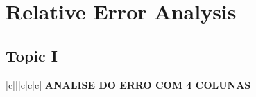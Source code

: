 \section{Relative Error Analysis}
\label{sec:erroranalysis}

\subsection{Topic I}
\label{subsec:first_topic_error}

\begin{center}
   \begin{tabular}{|c|||c|c|c|}
      \hline    
       {\bf ANALISE DO ERRO COM 4 COLUNAS} \\
      \hline
        
   \end{tabular}
 \end{center}
